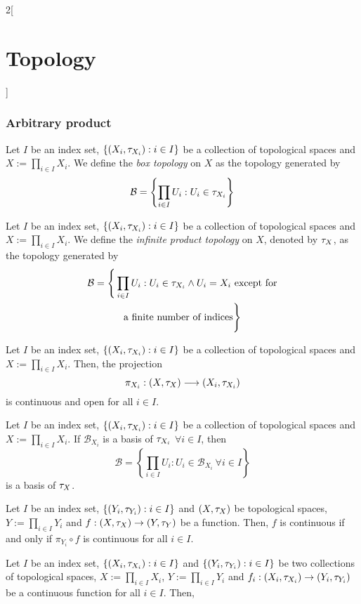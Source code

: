 \documentclass[../../../main.tex]{subfiles}
\begin{document}
\begin{multicols}{2}[\section{Topology}]
    \subsubsection{Arbitrary product}
    \begin{definition}
        Let $I$ be an index set, $\{(X_i,\tau_{X_i}):i\in I\}$ be a collection of topological spaces and $X:=\prod_{i\in I}X_i$. We define the \emph{box topology} on $X$ as the topology generated by $$\mathcal{B}=\left\{\prod_{i\in I}U_i:U_i\in\tau_{X_i}\right\}$$
    \end{definition}
    \begin{definition}
        Let $I$ be an index set, $\{(X_i,\tau_{X_i}):i\in I\}$ be a collection of topological spaces and $X:=\prod_{i\in I}X_i$. We define the \emph{infinite product topology} on $X$, denoted by $\tau_X$, as the topology generated by
        \begin{multline*}
            \mathcal{B}=\Bigg\{\prod_{i\in I}U_i:U_i\in\tau_{X_i}\land U_i=X_i\text{ except for}\\\text{a finite number of indices}\Bigg\}
        \end{multline*}
    \end{definition}
    \begin{prop}
        Let $I$ be an index set, $\{(X_i,\tau_{X_i}):i\in I\}$ be a collection of topological spaces and $X:=\prod_{i\in I}X_i$. Then, the projection $$\pi_{X_i}:\left(X,\tau_X\right)\longrightarrow (X_i,\tau_{X_i})$$
        is continuous and open for all $i\in I$.
    \end{prop}
    \begin{prop}
        Let $I$ be an index set, $\{(X_i,\tau_{X_i}):i\in I\}$ be a collection of topological spaces and $X:=\prod_{i\in I}X_i$. If $\mathcal{B}_{X_i}$ is a basis of $\tau_{X_i}$ $\forall i\in I$, then $$\mathcal{B}=\left\{\prod_{i\in I}U_i:U_i\in\mathcal{B}_{X_i}\ \forall i\in I\right\}$$
        is a basis of $\tau_X$.
    \end{prop}
    \begin{prop}
        Let $I$ be an index set, $\{(Y_i,\tau_{Y_i}):i\in I\}$ and $(X,\tau_X)$ be topological spaces, $Y:=\prod_{i\in I}Y_i$ and $f:(X,\tau_X)\rightarrow(Y,\tau_Y)$ be a function. Then, $f$ is continuous if and only if $\pi_{Y_i}\circ f$ is continuous for all $i\in I$.
    \end{prop}
    \begin{prop}
        Let $I$ be an index set, $\{(X_i,\tau_{X_i}):i\in I\}$ and $\{(Y_i,\tau_{Y_i}):i\in I\}$ be two collections of topological spaces, $X:=\prod_{i\in I}X_i$, $Y:=\prod_{i\in I}Y_i$ and $f_i:(X_i,\tau_{X_i})\rightarrow(Y_i,\tau_{Y_i})$ be a continuous function for all $i\in I$. Then,

\end{prop}
\end{multicols}
\end{document}
